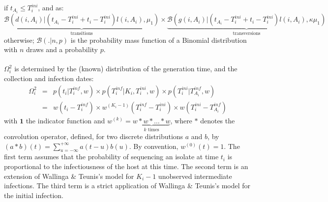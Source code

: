 \documentclass[10pt]{article}
\begin{document}
if $t_{A_i} \leq T_i^{ini} $, and as:
\begin{equation}
\underbrace{\mathcal{B}\left(d(i,A_i) | (t_{A_i} - T_i^{ini} + t_i - T_i^{ini}) l(i,A_i), \mu_1 \right)}_{\mbox{transitions}}
\times 
\underbrace{\mathcal{B}\left(g(i,A_i) | (t_{A_i} - T_i^{ini} + t_i - T_i^{ini}) l(i,A_i), \kappa \mu_1 \right)}_{\mbox{transversions}}
\end{equation}
otherwise; $\mathcal{B}(. | n, p)$ is the probability mass function of a Binomial distribution with $n$ draws and a probability $p$.
~\\

% 
~\\





$\Omega_i^2$ is determined by the (known) distribution of the generation time, and the collection and infection dates:
\begin{eqnarray}
 \Omega_i^2 & = & p(t_i | T_i^{inf}, w) \times p(T_i^{inf}| K_i,T_i^{ini}, w) \times p(T_i^{ini}| T_{A_i}^{inf}, w) \nonumber \\
& = &  w(t_i - T_i^{inf}) \times  w^{\left(K_i-1\right)}(T_i^{inf} - T_i^{ini}) \times w(T_i^{ini} - T_{A_i}^{inf})
\end{eqnarray}
with $\mathbf{1}$ the indicator function and $w^{\left(k\right)} = \underbrace{w*w*\ldots*w}_{k \text{ times}} $, where $*$ denotes the convolution operator, defined, for two discrete distributions $a$ and $b$, by $\left(a*b\right)\left(t\right) = \sum_{u=-\infty}^{+\infty} a\left(t-u\right)b\left(u\right)$. By convention, $w^{\left(0\right)}\left(t\right) = 1$.
The first term assumes that the probability of sequencing an isolate at time $t_i$ is proportional to the infectiousness of the host at this time.
The second term is an extension of Wallinga \& Teunis's model for $K_i-1$ unobserved intermediate infections.
The third term is a strict application of Wallinga \& Teunis's model for the initial infection.
\\
\end{document}
